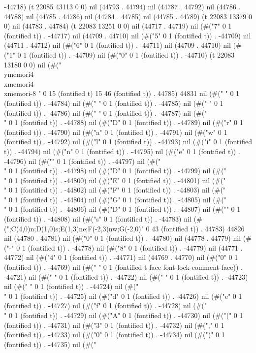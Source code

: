 -44718) (t 22085 43113 0 0) nil (44793 . 44794) nil (44787 . 44792) nil (44786 . 44788) nil (44785 . 44786) nil (44784 . 44785) nil (44785 . 44789) (t 22083 13379 0 0) nil (44783 . 44784) (t 22083 13251 0 0) nil (44717 . 44719) nil (#("7" 0 1 (fontified t)) . -44717) nil (44709 . 44710) nil (#("5" 0 1 (fontified t)) . -44709) nil (44711 . 44712) nil (#("6" 0 1 (fontified t)) . -44711) nil (44709 . 44710) nil (#("1" 0 1 (fontified t)) . -44709) nil (#("0" 0 1 (fontified t)) . -44710) (t 22083 13180 0 0) nil (#("   \\ymemori{4}
   \\xmemori{4}
   \\xmemori{-8}
" 0 15 (fontified t) 15 46 (fontified t)) . 44785) 44831 nil (#("
" 0 1 (fontified t)) . -44784) nil (#(" " 0 1 (fontified t)) . -44785) nil (#(" " 0 1 (fontified t)) . -44786) nil (#(" " 0 1 (fontified t)) . -44787) nil (#("\\" 0 1 (fontified t)) . -44788) nil (#("D" 0 1 (fontified t)) . -44789) nil (#("r" 0 1 (fontified t)) . -44790) nil (#("a" 0 1 (fontified t)) . -44791) nil (#("w" 0 1 (fontified t)) . -44792) nil (#("l" 0 1 (fontified t)) . -44793) nil (#("i" 0 1 (fontified t)) . -44794) nil (#("n" 0 1 (fontified t)) . -44795) nil (#("e" 0 1 (fontified t)) . -44796) nil (#("{" 0 1 (fontified t)) . -44797) nil (#("\\" 0 1 (fontified t)) . -44798) nil (#("D" 0 1 (fontified t)) . -44799) nil (#("\\" 0 1 (fontified t)) . -44800) nil (#("E" 0 1 (fontified t)) . -44801) nil (#("\\" 0 1 (fontified t)) . -44802) nil (#("F" 0 1 (fontified t)) . -44803) nil (#("\\" 0 1 (fontified t)) . -44804) nil (#("G" 0 1 (fontified t)) . -44805) nil (#("\\" 0 1 (fontified t)) . -44806) nil (#("D" 0 1 (fontified t)) . -44807) nil (#("}" 0 1 (fontified t)) . -44808) nil (#("s" 0 1 (fontified t)) . -44783) nil (#(";C(4,0)n;D(1,0)s;E(1,3)ne;F(-2,3)nw;G(-2,0)" 0 43 (fontified t)) . 44783) 44826 nil (44780 . 44781) nil (#("0" 0 1 (fontified t)) . -44780) nil (44778 . 44779) nil (#("-" 0 1 (fontified t)) . -44778) nil (#("8" 0 1 (fontified t)) . -44779) nil (44771 . 44772) nil (#("4" 0 1 (fontified t)) . -44771) nil (44769 . 44770) nil (#("0" 0 1 (fontified t)) . -44769) nil (#("
" 0 1 (fontified t face font-lock-comment-face)) . -44721) nil (#(" " 0 1 (fontified t)) . -44722) nil (#(" " 0 1 (fontified t)) . -44723) nil (#(" " 0 1 (fontified t)) . -44724) nil (#("\\" 0 1 (fontified t)) . -44725) nil (#("d" 0 1 (fontified t)) . -44726) nil (#("e" 0 1 (fontified t)) . -44727) nil (#("f" 0 1 (fontified t)) . -44728) nil (#("\\" 0 1 (fontified t)) . -44729) nil (#("A" 0 1 (fontified t)) . -44730) nil (#("(" 0 1 (fontified t)) . -44731) nil (#("3" 0 1 (fontified t)) . -44732) nil (#("," 0 1 (fontified t)) . -44733) nil (#("0" 0 1 (fontified t)) . -44734) nil (#(")" 0 1 (fontified t)) . -44735) nil (#("
